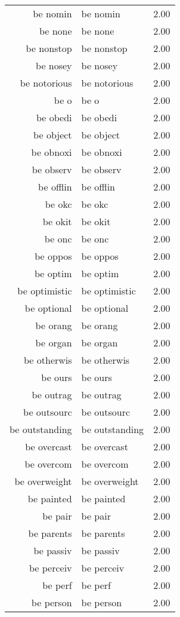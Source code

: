 \begin{table}[ht]
\begin{tabular}{rlr}
  be nomin & be nomin & 2.00 \\ 
  be none & be none & 2.00 \\ 
  be nonstop & be nonstop & 2.00 \\ 
  be nosey & be nosey & 2.00 \\ 
  be notorious & be notorious & 2.00 \\ 
  be o & be o & 2.00 \\ 
  be obedi & be obedi & 2.00 \\ 
  be object & be object & 2.00 \\ 
  be obnoxi & be obnoxi & 2.00 \\ 
  be observ & be observ & 2.00 \\ 
  be offlin & be offlin & 2.00 \\ 
  be okc & be okc & 2.00 \\ 
  be okit & be okit & 2.00 \\ 
  be onc & be onc & 2.00 \\ 
  be oppos & be oppos & 2.00 \\ 
  be optim & be optim & 2.00 \\ 
  be optimistic & be optimistic & 2.00 \\ 
  be optional & be optional & 2.00 \\ 
  be orang & be orang & 2.00 \\ 
  be organ & be organ & 2.00 \\ 
  be otherwis & be otherwis & 2.00 \\ 
  be ours & be ours & 2.00 \\ 
  be outrag & be outrag & 2.00 \\ 
  be outsourc & be outsourc & 2.00 \\ 
  be outstanding & be outstanding & 2.00 \\ 
  be overcast & be overcast & 2.00 \\ 
  be overcom & be overcom & 2.00 \\ 
  be overweight & be overweight & 2.00 \\ 
  be painted & be painted & 2.00 \\ 
  be pair & be pair & 2.00 \\ 
  be parents & be parents & 2.00 \\ 
  be passiv & be passiv & 2.00 \\ 
  be perceiv & be perceiv & 2.00 \\ 
  be perf & be perf & 2.00 \\ 
  be person & be person & 2.00 \\ 

\end{tabular}
\end{table}
